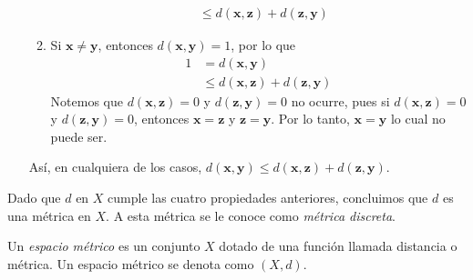 \begin{examplebox}{}{}
\begin{enumerate}[label=\roman*), topsep=6pt, itemsep=0pt]
\begin{enumerate}
\begin{align*}
                & \leq d(\mathbf{x}, \mathbf{z}) + d(\mathbf{z}, \mathbf{y})
            \end{align*}
            \item Si $\mathbf{x} \neq \mathbf{y}$, entonces $d(\mathbf{x}, \mathbf{y}) = 1$, por lo que
            \begin{align*}
                1 & = d(\mathbf{x}, \mathbf{y}) \\
                & \leq d(\mathbf{x}, \mathbf{z}) + d(\mathbf{z}, \mathbf{y})
            \end{align*}
            Notemos que $d(\mathbf{x}, \mathbf{z}) = 0$ y $d(\mathbf{z}, \mathbf{y}) = 0$ no ocurre, pues si $d(\mathbf{x}, \mathbf{z}) = 0$ y $d(\mathbf{z}, \mathbf{y}) = 0$, entonces $\mathbf{x} = \mathbf{z}$ y $\mathbf{z} = \mathbf{y}$. Por lo tanto, $\mathbf{x} = \mathbf{y}$ lo cual no puede ser.
        \end{enumerate}
        Así, en cualquiera de los casos, $d(\mathbf{x}, \mathbf{y}) \leq d(\mathbf{x}, \mathbf{z}) + d(\mathbf{z}, \mathbf{y})$.
    \end{enumerate}
    Dado que $d$ en $X$ cumple las cuatro propiedades anteriores, concluimos que $d$ es una métrica en $X$. A esta métrica se le conoce como \emph{métrica discreta}.
\end{examplebox}

\begin{definicion}{}{}
    Un \emph{espacio métrico} es un conjunto $X$ dotado de una función llamada distancia o métrica. Un espacio métrico se denota como $(X, d)$.
\end{definicion}

